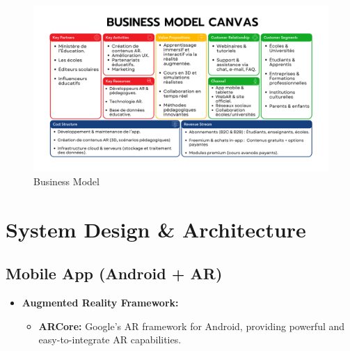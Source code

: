 \documentclass[11pt,                                          %
a4paper,                                       %
twoside]{report}                               %
\begin{document}
\begin{figure}[htbp]
	\centering
	\includegraphics[width=1\textwidth]{images/business_model.png}
	\caption{Business Model}
	\label{fig:sample}
\end{figure}


\chapter{System Design \& Architecture}

\section{Mobile App (Android + AR)}
\begin{itemize}
	\item \textbf{Augmented Reality Framework:}
	\begin{itemize}
		\item \textbf{ARCore:} Google's AR framework for Android, providing powerful and easy-to-integrate AR capabilities.
	\end{itemize}
\end{itemize}
\end{document}
